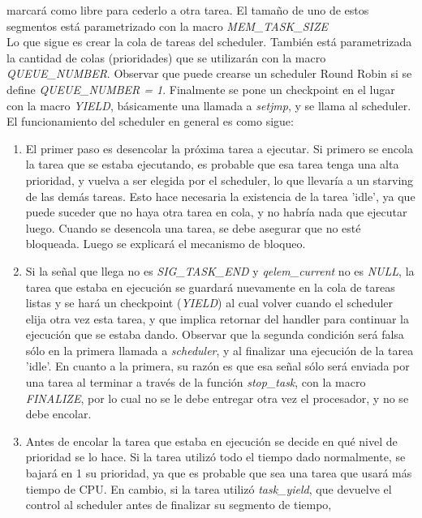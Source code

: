 \documentclass[a4paper]{article}
\begin{document}
marcará como libre para cederlo a otra tarea. El tamaño de uno de
estos segmentos está parametrizado con la macro \textit{MEM\_TASK\_SIZE}\\
Lo que sigue es crear la cola de tareas del scheduler. También está
parametrizada la cantidad de colas (prioridades) que se utilizarán
con la macro \textit{QUEUE\_NUMBER}. Observar que puede crearse un
scheduler Round Robin si se define \textit{QUEUE\_NUMBER = 1}. Finalmente
se pone un checkpoint en el lugar con la macro \textit{YIELD},
básicamente una llamada a \textit{setjmp}, y se llama al scheduler.\\
El funcionamiento del scheduler en general es como sigue:
\begin{enumerate}
    \item El primer paso es desencolar la pr\'oxima tarea a ejecutar.
    Si primero se encola la tarea que se estaba ejecutando, es probable
    que esa tarea tenga una alta prioridad, y vuelva a ser elegida por
    el scheduler, lo que llevar\'ia a un starving de las dem\'as tareas.
    Esto hace necesaria la existencia de la tarea 'idle', ya que puede
    suceder que no haya otra tarea en cola, y no habr\'ia nada que
    ejecutar luego. Cuando se desencola una tarea, se debe asegurar que
    no est\'e bloqueada. Luego se explicar\'a el mecanismo de bloqueo.
    \item Si la señal que llega no es \textit{SIG\_TASK\_END} y
    \textit{qelem\_current} no es \textit{NULL}, la tarea que estaba
    en ejecución se guardará nuevamente en la cola de tareas listas
    y se hará un checkpoint (\textit{YIELD}) al cual volver cuando
    el scheduler elija otra vez esta tarea, y que implica retornar
    del handler para continuar la ejecución que se estaba dando.
    Observar que la segunda condición será falsa sólo en la primera
    llamada a \textit{scheduler}, y al finalizar una ejecuci\'on de
    la tarea 'idle'. En cuanto a la primera, su razón es
    que esa señal sólo será enviada por una tarea al terminar a
    través de la función \textit{stop\_task}, con la macro
    \textit{FINALIZE}, por lo cual no se le debe entregar otra
    vez el procesador, y no se debe encolar.
    \item Antes de encolar la tarea que estaba en ejecución se decide
    en qué nivel de prioridad se lo hace. Si la tarea utilizó todo
    el tiempo dado normalmente, se bajará en 1 su prioridad, ya que
    es probable que sea una tarea que usará más tiempo de CPU.
    En cambio, si la tarea utilizó \textit{task\_yield}, que devuelve
    el control al scheduler antes de finalizar su segmento de tiempo,

\end{enumerate}
\end{document}
